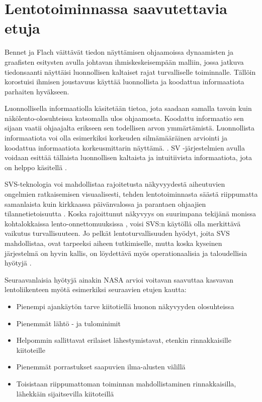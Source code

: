 \documentclass[utf8,bachelor,manualbib]{gradu3}
\begin{document}
\section{Lentotoiminnassa saavutettavia etuja}

Bennet ja Flach \citeyearpar{bennetflach1994} väittävät tiedon näyttämisen ohjaamoissa dynaamisten ja graafisten esitysten avulla johtavan ihmiskeskeisempään malliin, jossa jatkuva tiedonsaanti näyttäisi luonnollisen kaltaiset rajat turvalliselle toiminnalle. Tällöin korostuisi ihmisen joustavuus käyttää luonnollista ja koodattua informaatiota parhaiten hyväkseen.

Luonnollisella informaatiolla käsitetään tietoa, jota saadaan samalla tavoin kuin näkölento-olosuhteissa katsomalla ulos ohjaamosta. Koodattu informaatio sen sijaan vaatii ohjaajalta erikseen sen todellisen arvon ymmärtämistä. Luonnollista informaatiota voi olla esimerkiksi korkeuden silmämääräinen arviointi ja koodattua informaatiota korkeusmittarin näyttämä. \citep{prinzel2004}. SV -järjestelmien avulla voidaan esittää tällaista luonnollisen kaltaista ja intuitiivista informaatiota, jota on helppo käsitellä \citep{wickensandre1990}.

SVS-teknologia voi mahdollistaa rajoitetusta näkyvyydestä aiheutuvien ongelmien ratkaisemisen visuaalisesti, tehden lentotoiminnasta säästä riippumatta samanlaista kuin kirkkaassa päivänvalossa ja parantaen ohjaajien tilannetietoisuutta \citep{prinzel2004}. Koska rajoittunut näkyvyys on suurimpana tekijänä monissa kohtalokkaissa lento-onnettomuuksissa \citep{boeing1996}, voisi SVS:n käytöllä olla merkittävä vaikutus turvallisuuteen. Jo pelkät lentoturvallisuuden hyödyt, joita SVS mahdollistaa, ovat tarpeeksi aiheen tutkimiselle, mutta koska kyseinen järjestelmä on hyvin kallis, on löydettävä myös operationaalisia ja taloudellisia hyötyjä \citep{prinzel2004}.

Seuraavanlaisia hyötyjä ainakin NASA \citeyearpar{williamsym2001} arvioi voitavan saavuttaa kasvavan lentoliikenteen myötä esimerkiksi seuraavien etujen kautta:

\begin{itemize}
\item Pienempi ajankäytön tarve kiitotiellä huonon näkyvyyden olosuhteissa
\item Pienemmät lähtö - ja tulominimit
\item Helpommin sallittavat erilaiset lähestymistavat, etenkin rinnakkaisille kiitoteille
\item Pienemmät porrastukset saapuvien ilma-alusten välillä
\item Toisistaan riippumattoman toiminnan mahdollistaminen rinnakkaisilla, lähekkäin sijaitsevilla kiitoteillä
\end{itemize} 
\end{document}
